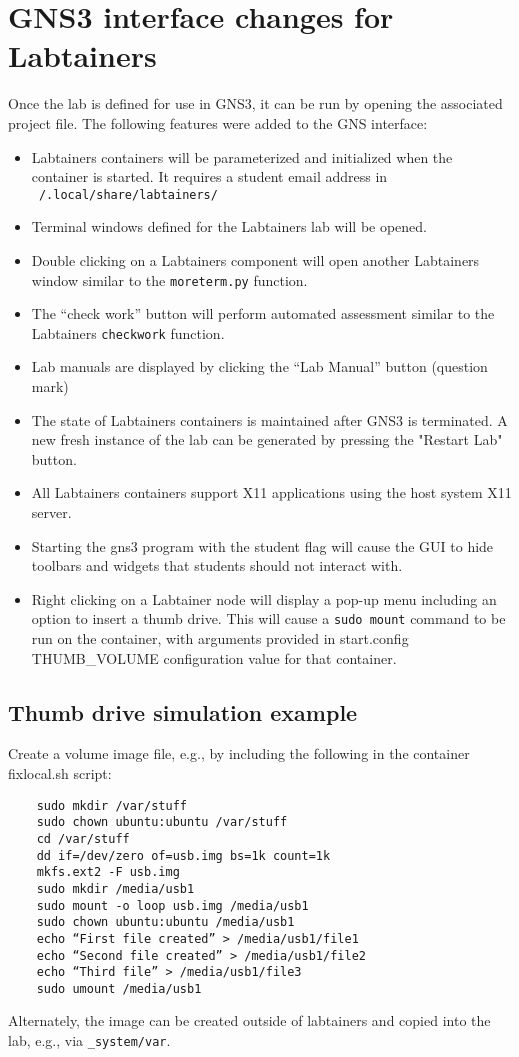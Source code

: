 \documentclass[12pt]{article}
\begin{document}
\section{GNS3 interface changes for Labtainers}
Once the lab is defined for use in GNS3, it can be run by opening the associated project file.  The following features were added to the GNS interface:
\begin{itemize}
	\item Labtainers containers will be parameterized and initialized when the container is started.  It requires a student email address in
		{\tt ~/.local/share/labtainers/}
	\item Terminal windows defined for the Labtainers lab will be opened.
	\item Double clicking on a Labtainers component will open another Labtainers window similar to the {\tt moreterm.py} function.
	\item The ``check work'' button will perform automated assessment similar to the Labtainers {\tt checkwork} function.
	\item Lab manuals are displayed by clicking the ``Lab Manual'' button (question mark)
	\item The state of Labtainers containers is maintained after GNS3 is terminated.  A new fresh instance of the lab can be generated
		by pressing the "Restart Lab" button.
	\item All Labtainers containers support X11 applications using the host system X11 server.
	\item Starting the gns3 program with the \-\-student flag will cause the GUI to hide toolbars and widgets that students should not interact with.
        \item Right clicking on a Labtainer node will display a pop-up menu including an option to insert a thumb drive.  This will cause
              a {\tt sudo mount} command to be run on the container, with arguments provided in start.config THUMB\_VOLUME configuration
              value for that container.
\end{itemize}
\subsection{Thumb drive simulation example}
Create a volume image file, e.g., by including the following in the container fixlocal.sh script:
\begin{verbatim}
    sudo mkdir /var/stuff
    sudo chown ubuntu:ubuntu /var/stuff
    cd /var/stuff
    dd if=/dev/zero of=usb.img bs=1k count=1k
    mkfs.ext2 -F usb.img
    sudo mkdir /media/usb1
    sudo mount -o loop usb.img /media/usb1
    sudo chown ubuntu:ubuntu /media/usb1
    echo “First file created” > /media/usb1/file1
    echo “Second file created” > /media/usb1/file2
    echo “Third file” > /media/usb1/file3
    sudo umount /media/usb1
\end{verbatim}
\noindent Alternately, the image can be created outside of labtainers and copied into the lab, e.g., via {\tt \_system/var}.
\end{document}
